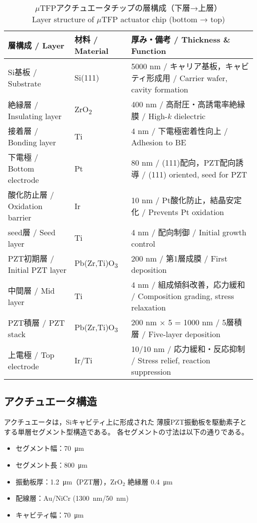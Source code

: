 \documentclass[conference]{IEEEtran}
\begin{document}
\begin{table*}[t]
  \centering
  \caption{%
    $\mu$TFPアクチュエータチップの層構成（下層→上層）\\
    Layer structure of $\mu$TFP actuator chip (bottom → top)
  }
  \label{tab:layer-structure}
  \begin{tabular}{lll}
    \hline
    \textbf{層構成 / Layer} & \textbf{材料 / Material} & \textbf{厚み・備考 / Thickness \& Function} \\
    \hline
    Si基板 / Substrate & Si(111) & 5000 nm / キャリア基板，キャビティ形成用 / Carrier wafer, cavity formation \\
    絶縁層 / Insulating layer & ZrO\textsubscript{2} & 400 nm / 高耐圧・高誘電率絶縁膜 / High-$k$ dielectric \\
    接着層 / Bonding layer & Ti & 4 nm / 下電極密着性向上 / Adhesion to BE \\
    下電極 / Bottom electrode & Pt & 80 nm / (111)配向，PZT配向誘導 / (111) oriented, seed for PZT \\
    酸化防止層 / Oxidation barrier & Ir & 10 nm / Pt酸化防止，結晶安定化 / Prevents Pt oxidation \\
    seed層 / Seed layer & Ti & 4 nm / 配向制御 / Initial growth control \\
    PZT初期層 / Initial PZT layer & Pb(Zr,Ti)O\textsubscript{3} & 200 nm / 第1層成膜 / First deposition \\
    中間層 / Mid layer & Ti & 4 nm / 組成傾斜改善，応力緩和 / Composition grading, stress relaxation \\
    PZT積層 / PZT stack & Pb(Zr,Ti)O\textsubscript{3} & 200 nm × 5 = 1000 nm / 5層積層 / Five-layer deposition \\
    上電極 / Top electrode & Ir/Ti & 10/10 nm / 応力緩和・反応抑制 / Stress relief, reaction suppression \\
    \hline
  \end{tabular}
\end{table*}

\subsection{アクチュエータ構造}
アクチュエータは，Siキャビティ上に形成された
薄膜PZT振動板を駆動素子とする単層セグメント型構造である。
各セグメントの寸法は以下の通りである。
\begin{itemize}
  \item セグメント幅：\SI{70}{\micro m}
  \item セグメント長：\SI{800}{\micro m}
  \item 振動板厚：\SI{1.2}{\micro m}（PZT層），ZrO$_2$ 絶縁層 \SI{0.4}{\micro m}
  \item 配線層：Au/NiCr (\SI{1300}{nm}/\SI{50}{nm})
  \item キャビティ幅：\SI{70}{\micro m}
\end{itemize}
\end{document}
